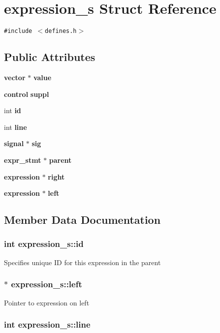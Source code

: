 \section{expression\_\-s  Struct Reference}
\label{structexpression__s}
{\tt \#include $<$defines.h$>$}

\subsection*{Public Attributes}
\begin{CompactItemize}
\item 
{\bf vector} $\ast$ {\bf value}
\item 
{\bf control} {\bf suppl}
\item 
int {\bf id}
\item 
int {\bf line}
\item 
{\bf signal} $\ast$ {\bf sig}
\item 
{\bf expr\_\-stmt} $\ast$ {\bf parent}
\item 
{\bf expression} $\ast$ {\bf right}
\item 
{\bf expression} $\ast$ {\bf left}
\end{CompactItemize}


\subsection{Member Data Documentation}
\subsubsection{\setlength{\rightskip}{0pt plus 5cm}int expression\_\-s::id}\label{structexpression__s_m2}


Specifies unique ID for this expression in the parent 
\subsubsection{$\ast$ expression\_\-s::left}\label{structexpression__s_m7}


Pointer to expression on left 
\subsubsection{\setlength{\rightskip}{0pt plus 5cm}int expression\_\-s::line}\label{structexpression__s_m3}


